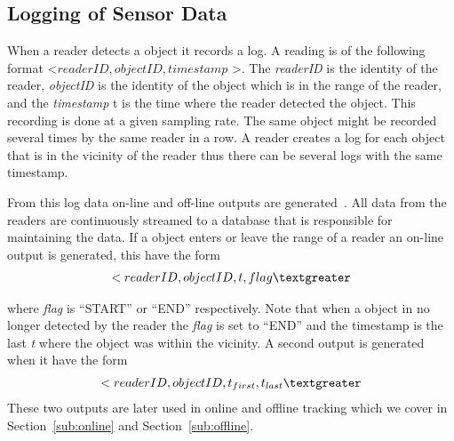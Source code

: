 \subsection{Logging of Sensor Data}
When a reader detects a object it records a log. 
A reading is of the following format \textless $readerID,objectID,timestamp$ \textgreater.
The \textit{readerID} is the identity of the reader, \textit{objectID} is the identity of the object which is in the range of the reader, and the \textit{timestamp} t is the time where the reader detected the object.
This recording is done at a given sampling rate. 
The same object might be recorded several times by the same reader in a row. 
A reader creates a log for each object that is in the vicinity of the reader thus there can be several logs with the same timestamp.

From this log data on-line and off-line outputs are generated~\cite{Jensen:2009:GMB:1590953.1591000}.
All data from the readers are continuously streamed to a database that is responsible for maintaining the data.
If a object enters or leave the range of a reader an on-line output is generated, this have the form
\begin{align}
\textless readerID,objectID,t,flag \textgreater 
\end{align}

where \textit{flag} is "`START"' or "`END"' respectively. 
Note that when a object in no longer detected by the reader  the \textit{flag} is set to "`END"' and the timestamp is the last \textit{t} where the object was within the vicinity.
A second output is generated when it have the form 
\begin{align}
\textless\textit{$readerID,objectID,t_{first},t_{last}$}\textgreater
\end{align}
These two outputs are later used in online and offline tracking which we cover in Section~\ref{sub:online} and Section~\ref{sub:offline}.

 
